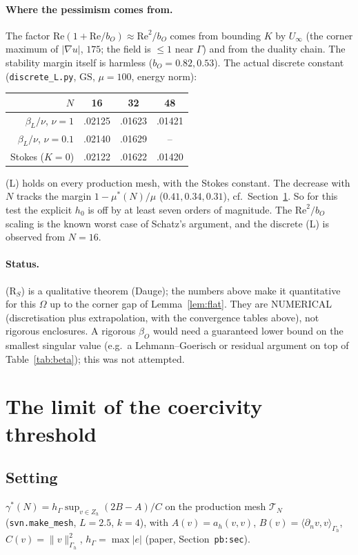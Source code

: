 \documentclass[11pt]{article}
\theoremstyle{definition}
\theoremstyle{remark}
\newcommand{\hG}{h_\Gamma}
\newcommand{\Gh}{\Gamma_h}
\newcommand{\Zh}{Z_h}
\newcommand{\norm}[1]{\|#1\|}
\newcommand{\ip}[2]{\langle #1,#2\rangle}
\newcommand{\dn}{\partial_n}
\newcommand{\GS}{\mathrm{GS}}
\renewcommand{\Re}{\mathrm{Re}}
\begin{document}
\paragraph{Where the pessimism comes from.} The factor $\Re(1+\Re/b_O)\approx\Re^2/b_O$ comes from bounding $K$ by $U_\infty$ (the corner maximum of $|\nabla u|$, $175$; the field is $\le1$ near $\Gamma$) and from the duality chain. The stability margin itself is harmless ($b_O=0.82,0.53$). The actual discrete constant (\texttt{discrete\_L.py}, $\GS$, $\mu=100$, energy norm):
\begin{center}\small
\begin{tabular}{r|ccc}
\toprule
$N$ & 16 & 32 & 48\\
\midrule
$\beta_L/\nu$, $\nu=1$ & .02125 & .01623 & .01421\\
$\beta_L/\nu$, $\nu=0.1$ & .02140 & .01629 & --\\
Stokes ($K=0$) & .02122 & .01622 & .01420\\
\bottomrule
\end{tabular}
\end{center}
(L) holds on every production mesh, with the Stokes constant. The decrease with $N$ tracks the margin $1-\mu^\ast(N)/\mu$ ($0.41,0.34,0.31$), cf.\ Section~\ref{sec:gam}. So for this test the explicit $h_0$ is off by at least seven orders of magnitude. The $\Re^2/b_O$ scaling is the known worst case of Schatz's argument, and the discrete (L) is observed from $N=16$.

\paragraph{Status.} (R$_S$) is a qualitative theorem (Dauge); the numbers above make it quantitative for this $\Omega$ up to the corner gap of Lemma~\ref{lem:flat}. They are NUMERICAL (discretisation plus extrapolation, with the convergence tables above), not rigorous enclosures. A rigorous $\beta_O$ would need a guaranteed lower bound on the smallest singular value (e.g.\ a Lehmann--Goerisch or residual argument on top of Table~\ref{tab:beta}); this was not attempted.

\section{The limit of the coercivity threshold}\label{sec:gam}

\subsection{Setting}
$\gamma^\ast(N)=\hG\sup_{v\in\Zh}(2B-A)/C$ on the production mesh $\mathcal T_N$ (\texttt{svn.make\_mesh}, $L=2.5$, $k=4$), with $A(v)=a_h(v,v)$, $B(v)=\ip{\dn v}{v}_{\Gh}$, $C(v)=\norm v^2_{\Gh}$, $\hG=\max|e|$ (paper, Section~\texttt{pb:sec}).
\end{document}
